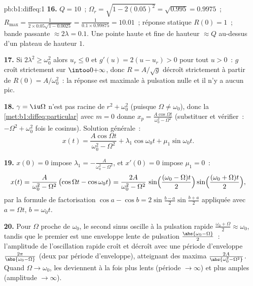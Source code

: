 \begin{solution}{pb:b1:diffeq:1}
\textbf{16.} $Q = 10$~; $\Omega_r = \sqrt{1 - 2(0.05)^2} =
\sqrt{0.995} = 0.9975$~; $R_{\max} = \frac1{2 \times 0.05
\sqrt{1 - 0.0025}} = \frac1{0.1 \times 0.99875} = 10.01$~; réponse
statique $R(0) = 1$~; bande passante $\approx 2\lambda = 0.1$. Une
pointe haute et fine de hauteur $\approx Q$ au-dessus d'un plateau de
hauteur $1$.

\textbf{17.} Si $2\lambda^2 \geq \omega_0^2$ alors $u_r \leq 0$ et
$g'(u) = 2(u - u_r) > 0$ pour tout $u > 0$~: $g$ croît strictement sur
$\intoo0{+\infty}$, donc $R = A/\sqrt g$ décroît strictement à partir
de $R(0) = A/\omega_0^2$~: la réponse est maximale à pulsation nulle
et il n'y a aucun pic.

\textbf{18.} $\gamma = \iu\Omega$ n'est pas racine de $r^2 +
\omega_0^2$ (puisque $\Omega \neq \omega_0$), donc
la \cref{met:b1:diffeq:particular} avec $m = 0$ donne $x_p =
\frac{A\cos\Omega t}{\omega_0^2 - \Omega^2}$ (substituer et
vérifier~: $-\Omega^2 + \omega_0^2$ fois le cosinus). Solution
générale~:
\[
x(t) = \frac{A\cos\Omega t}{\omega_0^2 - \Omega^2}
+ \lambda_1\cos\omega_0 t + \mu_1\sin\omega_0 t .
\]

\textbf{19.} $x(0) = 0$ impose $\lambda_1 = -\frac A{\omega_0^2 -
\Omega^2}$, et $x'(0) = 0$ impose $\mu_1 = 0$~:
\[
x(t) = \frac{A}{\omega_0^2 - \Omega^2}\,
\bigl(\cos\Omega t - \cos\omega_0 t\bigr)
= \frac{2A}{\omega_0^2 - \Omega^2}\,
\sin\Bigl(\frac{(\omega_0 - \Omega)t}2\Bigr)
\sin\Bigl(\frac{(\omega_0 + \Omega)t}2\Bigr) ,
\]
par la formule de factorisation $\cos a - \cos b =
2\sin\frac{b - a}2\sin\frac{b + a}2$ appliquée avec $a = \Omega t$,
$b = \omega_0 t$.

\textbf{20.} Pour $\Omega$ proche de $\omega_0$, le second sinus
oscille à la pulsation rapide $\frac{\omega_0 + \Omega}2 \approx
\omega_0$, tandis que le premier est une enveloppe lente de pulsation
$\frac{\abs{\omega_0 - \Omega}}2$~: l'amplitude de l'oscillation
rapide croît et décroît avec une période d'enveloppe
$\frac{2\pi}{\abs{\omega_0 - \Omega}}$ (deux  par période
d'enveloppe), atteignant des maxima $\frac{2A}{\abs{\omega_0^2 -
\Omega^2}}$. Quand $\Omega \to \omega_0$, les  deviennent à
la fois plus lents (période $\to \infty$) et plus amples (amplitude
$\to \infty$).


\end{solution}
